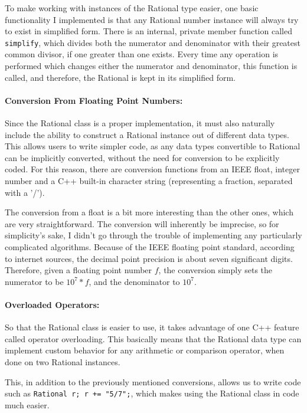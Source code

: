 \documentclass[11pt, a4paper]{article}
\begin{document}
To make working with instances of the Rational type easier, one basic functionality I implemented is that any Rational number instance will always try to exist in simplified form.
There is an internal, private member function called \texttt{simplify}, which divides both the numerator and denominator with their greatest common divisor, if one greater than one exists.
Every time any operation is performed which changes either the numerator and denominator, this function is called, and therefore, the Rational is kept in its simplified form.

\paragraph{Conversion From Floating Point Numbers:}

Since the Rational class is a proper implementation, it must also naturally include the ability to construct a Rational instance out of different data types.
This allows users to write simpler code, as any data types convertible to Rational can be implicitly converted, without the need for conversion to be explicitly coded.
For this reason, there are conversion functions from an IEEE float, integer number and a C++ built-in character string (representing a fraction, separated with a '/').

The conversion from a float is a bit more interesting than the other ones, which are very straightforward.
The conversion will inherently be imprecise, so for simplicity's sake, I didn't go through the trouble of implementing any particularly complicated algorithms.
Because of the IEEE floating point standard, according to internet sources, the decimal point precision is about seven significant digits.
Therefore, given a floating point number $f$, the conversion simply sets the numerator to be $10^7*f$, and the denominator to $10^7$.

\paragraph{Overloaded Operators:}

So that the Rational class is easier to use, it takes advantage of one C++ feature called operator overloading.
This basically means that the Rational data type can implement custom behavior for any arithmetic or comparison operator, when done on two Rational instances.

This, in addition to the previously mentioned conversions, allows us to write code such as \texttt{Rational r; r += "5/7";}, which makes using the Rational class in code much easier.
\end{document}
